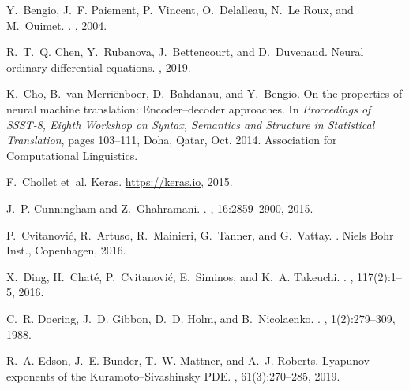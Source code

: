 \documentclass[preprint,aps,pre,letterpaper,onecolumn,superscriptaddress]{revtex4-2} %
\begin{document}
\begin{thebibliography}{10}

Y.~Bengio, J.~F. Paiement, P.~Vincent, O.~Delalleau, N.~{Le Roux}, and
  M.~Ouimet.
.
, 2004.

R.~T.~Q. Chen, Y.~Rubanova, J.~Bettencourt, and D.~Duvenaud.
\newblock Neural ordinary differential equations.
, 2019.

K.~Cho, B.~van Merri{\"e}nboer, D.~Bahdanau, and Y.~Bengio.
\newblock On the properties of neural machine translation: Encoder{--}decoder
  approaches.
\newblock In {\em Proceedings of {SSST}-8, Eighth Workshop on Syntax, Semantics
  and Structure in Statistical Translation}, pages 103--111, Doha, Qatar, Oct.
  2014. Association for Computational Linguistics.

F.~Chollet et~al.
\newblock Keras.
\newblock \url{https://keras.io}, 2015.

J.~P. Cunningham and Z.~Ghahramani.
.
, 16:2859--2900, 2015.

P.~Cvitanovi{\'c}, R.~Artuso, R.~Mainieri, G.~Tanner, and G.~Vattay.
.
\newblock Niels Bohr Inst., Copenhagen, 2016.

X.~Ding, H.~Chat{\'{e}}, P.~Cvitanovi{\'{c}}, E.~Siminos, and K.~A. Takeuchi.
.
, 117(2):1--5, 2016.

C.~R. Doering, J.~D. Gibbon, D.~D. Holm, and B.~Nicolaenko.
.
, 1(2):279--309, 1988.

R.~A. Edson, J.~E. Bunder, T.~W. Mattner, and A.~J. Roberts.
\newblock Lyapunov exponents of the {K}uramoto–{S}ivashinsky {PDE}.
, 61(3):270–285, 2019.


\end{thebibliography}
\end{document}
